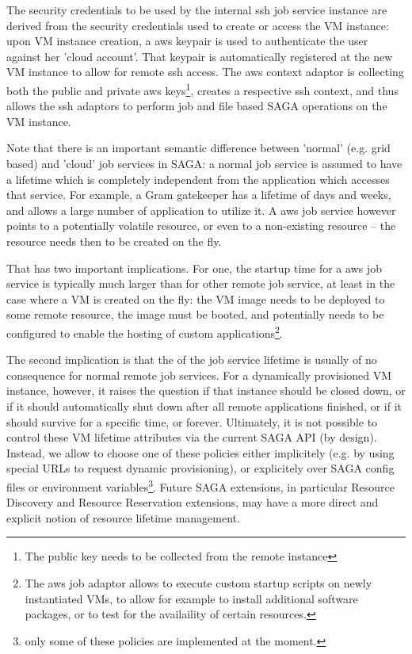   The security credentials to be used by the internal ssh job service
  instance are derived from the security credentials used to create or
  access the VM instance: upon VM instance creation, a aws keypair is
  used to authenticate the user against her 'cloud account'.  That
  keypair is automatically registered at the new VM instance to allow
  for remote ssh access.  The aws context adaptor is collecting both
  the public and private aws keys\footnote{The public key needs to be
  collected from the remote instance}, creates a respective ssh context,
  and thus allows the ssh adaptors to perform job and file based SAGA
  operations on the VM instance.

  Note that there is an important semantic difference between 'normal'
  (e.g. grid based) and 'cloud' job services in SAGA: a normal job
  service is assumed to have a lifetime which is completely
  independent from the application which accesses that service.  For
  example, a Gram gatekeeper has a lifetime of days and weeks, and
  allows a large number of application to utilize it.  A aws job
  service however points to a potentially  volatile resource, or even
  to a non-existing resource -- the resource needs then to be created
  on the fly.

  That has two important implications.  For one, the startup time for
  a aws job service is typically much larger than for other remote job
  service, at least in the case where a VM is created on the fly: the
  VM image needs to be deployed to some remote resource, the image
  must be booted, and potentially needs to be configured to enable the
  hosting of custom applications\footnote{The aws job adaptor allows
  to execute custom startup scripts on newly instantiated VMs, to
  allow for example to install additional software packages, or to
  test for the availaility of certain resources.}.

  The second implication is that the  of the job service
  lifetime is usually of no consequence for normal remote job
  services.  For a dynamically provisioned VM instance, however, it
  raises the question if that instance should be closed down, or if it
  should automatically shut down after all remote applications
  finished, or if it should  survive for a specific time, or forever.
  Ultimately, it is not possible to control these VM lifetime
  attributes via the current SAGA API (by design).  Instead, we allow
  to choose one of these policies either implicitely (e.g. by using
  special URLs to request dynamic provisioning), or explicitely over
  SAGA config files or environment variables\footnote{only some of
  these policies are implemented at the moment.}.  Future SAGA
  extensions, in particular Resource Discovery and Resource
  Reservation extensions, may have a more direct and explicit notion
  of resource lifetime management.


